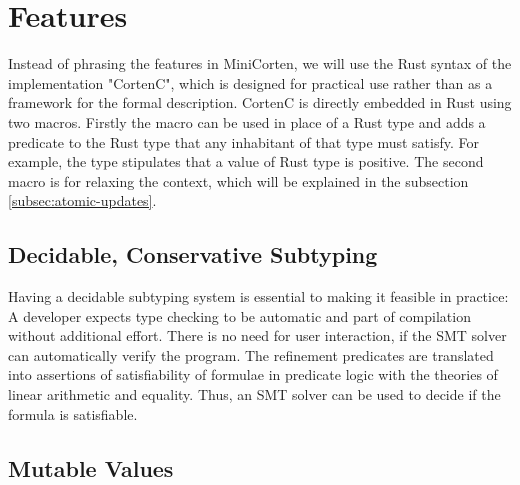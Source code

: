 \documentclass[twoside, english]{sdqthesis}
\theoremstyle{definition}
\begin{document}
\section{Features}

Instead of phrasing the features in MiniCorten, we will use the Rust syntax of the implementation "CortenC", which is designed for practical use rather than as a framework for the formal description.
CortenC is directly embedded in Rust using two macros. Firstly the macro  can be used in place of a Rust type and adds a predicate to the Rust type that any inhabitant of that type must satisfy. For example, the type  stipulates that a value of Rust type  is positive. The second macro is  for relaxing the context, which will be explained in the subsection \ref{subsec:atomic-updates}.

\subsection{Decidable, Conservative Subtyping}

Having a decidable subtyping system is essential to making it feasible in practice: A developer expects type checking to be automatic and part of compilation without additional effort. There is no need for user interaction, if the SMT solver can automatically verify the program.
The refinement predicates are translated into assertions of satisfiability of formulae in predicate logic with the theories of linear arithmetic and equality. Thus, an SMT solver can be used to decide if the formula is satisfiable.

\subsection{Mutable Values}
\end{document}
